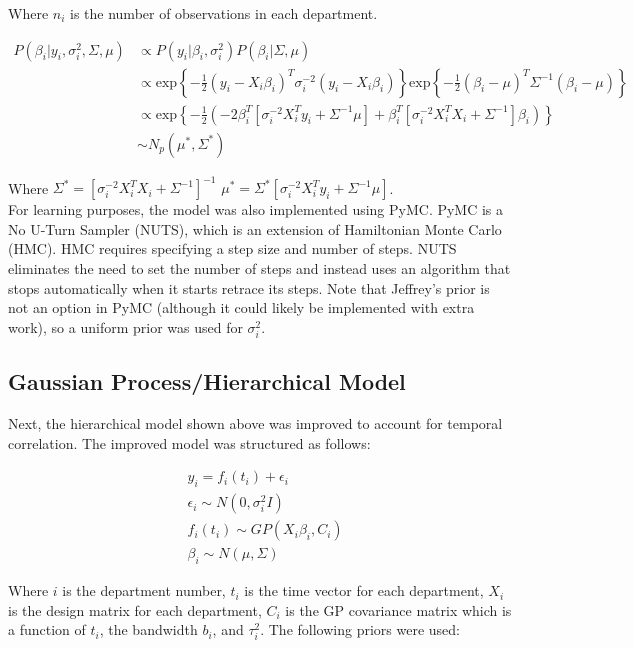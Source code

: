 \documentclass[paper=a4, fontsize=11pt]{scrartcl}
\begin{document}
Where $n_i$ is the number of observations in each department.

\begin{align*}
     P(\beta_i | y_i, \sigma^2_i, \Sigma, \mu ) & \propto P(y_i| \beta_i,  \sigma^2_i)P(\beta_i| \Sigma, \mu) \\
     & \propto\mbox{exp}\left \{ -\frac{1}{2}(y_i-X_i\beta_i)^T \sigma^{-2}_i(y_i-X_i\beta_i)      \right \} \mbox{exp}\left \{ -\frac{1}{2}(\beta_i-\mu)^T \Sigma^{-1}(\beta_i-\mu)      \right \} \\
     & \propto \mbox{exp}\left \{ -\frac{1}{2}\left(-2\beta_i^T[\sigma^{-2}_iX_i^Ty_i + \Sigma^{-1}\mu] + \beta_i^T[\sigma^{-2}_i X^T_i X_i + 
     \Sigma^{-1}]\beta_i \right)      \right \}\\
    &\sim N_p (\mu^*, \Sigma^*)
\end{align*}


Where  $\Sigma^*=[\sigma^{-2}_iX^T_iX_i + 
     \Sigma^{-1}]^{-1} $ $\mu^*=\Sigma^*[\sigma^{-2}_i X_i^T y_i + \Sigma^{-1}\mu]$.\\


For learning purposes, the model was also implemented using PyMC. PyMC is a No U-Turn Sampler (NUTS), which is an extension of Hamiltonian Monte Carlo (HMC). HMC requires specifying a step size and number of steps. NUTS eliminates the need to set the number of steps and instead uses an algorithm that stops automatically
when it starts retrace its steps. Note that Jeffrey's prior is not an option in PyMC (although it could likely be implemented with extra work), so a uniform prior was used for $\sigma_i^2$.

\subsection{Gaussian Process/Hierarchical Model}
Next, the hierarchical model shown above was improved to account for temporal correlation. The improved model was structured as follows:

\begin{align*}
    &y_i = f_i (t_i) + \epsilon_i \\
     &\epsilon_i \sim N(0, \sigma^2_i I)\\
     &f_i (t_i) \sim GP(X_i \beta_i, C_i)\\
     & \beta_i \sim N(\mu, \Sigma)
\end{align*}

Where $i$ is the department number, $t_i$ is the time vector for each department, $X_i$ is the design matrix for each department, $C_i$ is the GP covariance matrix which is a function of $t_i$, the bandwidth $b_i$, and $\tau^2_i$. The following priors were used:
\end{document}
